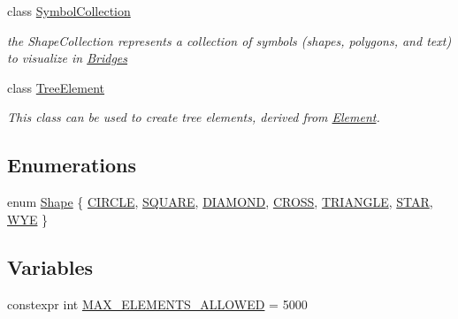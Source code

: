 \begin{DoxyCompactItemize}
class \mbox{\hyperlink{classbridges_1_1datastructure_1_1_symbol_collection}{Symbol\+Collection}}
\begin{DoxyCompactList}\small\item\em the Shape\+Collection represents a collection of symbols (shapes, polygons, and text) to visualize in \mbox{\hyperlink{classbridges_1_1_bridges}{Bridges}} \end{DoxyCompactList}\item 
class \mbox{\hyperlink{classbridges_1_1datastructure_1_1_tree_element}{Tree\+Element}}
\begin{DoxyCompactList}\small\item\em This class can be used to create tree elements, derived from \mbox{\hyperlink{classbridges_1_1datastructure_1_1_element}{Element}}. \end{DoxyCompactList}\end{DoxyCompactItemize}
\subsection*{Enumerations}
\begin{DoxyCompactItemize}
\item 
enum \mbox{\hyperlink{namespacebridges_1_1datastructure_a3408f5f44d9c6062e5f3adb7e1bbb7f0}{Shape}} \{ \newline
\mbox{\hyperlink{namespacebridges_1_1datastructure_a3408f5f44d9c6062e5f3adb7e1bbb7f0a18ad7c088ebdda05673a1a586eede99a}{C\+I\+R\+C\+LE}}, 
\mbox{\hyperlink{namespacebridges_1_1datastructure_a3408f5f44d9c6062e5f3adb7e1bbb7f0a63cd254f1ceccbe871f60e3b7f0666d5}{S\+Q\+U\+A\+RE}}, 
\mbox{\hyperlink{namespacebridges_1_1datastructure_a3408f5f44d9c6062e5f3adb7e1bbb7f0a170d2d8b57d448ed19e563ee3cd28b35}{D\+I\+A\+M\+O\+ND}}, 
\mbox{\hyperlink{namespacebridges_1_1datastructure_a3408f5f44d9c6062e5f3adb7e1bbb7f0ab6afc15f9badffaf05a23b3f1ba1081a}{C\+R\+O\+SS}}, 
\newline
\mbox{\hyperlink{namespacebridges_1_1datastructure_a3408f5f44d9c6062e5f3adb7e1bbb7f0ab1bf469052aa5abf241c54f8331b6fc4}{T\+R\+I\+A\+N\+G\+LE}}, 
\mbox{\hyperlink{namespacebridges_1_1datastructure_a3408f5f44d9c6062e5f3adb7e1bbb7f0a995b35f7cf12b5842d94aba9ce5c8b4d}{S\+T\+AR}}, 
\mbox{\hyperlink{namespacebridges_1_1datastructure_a3408f5f44d9c6062e5f3adb7e1bbb7f0aa0494702a25d198f538266dcb8ba52df}{W\+YE}}
 \}
\end{DoxyCompactItemize}
\subsection*{Variables}
\begin{DoxyCompactItemize}
\item 
constexpr int \mbox{\hyperlink{namespacebridges_1_1datastructure_a2e75baaa66b6c9cd3f5c5f598b2c8147}{M\+A\+X\+\_\+\+E\+L\+E\+M\+E\+N\+T\+S\+\_\+\+A\+L\+L\+O\+W\+ED}} = 5000
\end{DoxyCompactItemize}


